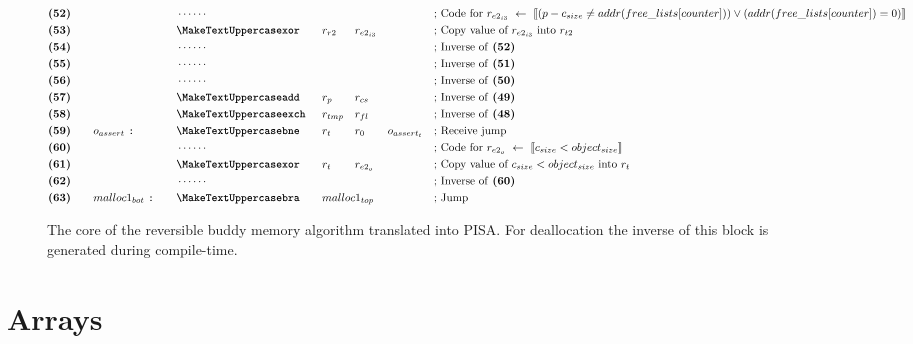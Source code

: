 \begin{figure}[ht]
{\begin{minipage}{\linewidth}
\begin{alignat*}{7}
    &\textbf{(52)}\quad&& &&\cdots\cdots && && && &&\text{; Code for $r_{e2_{i3}}\ \leftarrow\ \llbracket (p - c_{size} \neq addr(free\_lists[counter])) \vee (addr(free\_lists[counter]) = 0) \rrbracket$}\\
    &\textbf{(53)}\quad&& &&\inst{xor} &&r_{r2} && r_{e2_{i3}} && && \text{; Copy value of $r_{e2_{i3}}$ into $r_{t2}$}\\
    &\textbf{(54)}\quad&& &&\cdots\cdots && && && &&\text{; Inverse of \textbf{(52)}}\\
    &\textbf{(55)}\quad&& &&\cdots\cdots && && && &&\text{; Inverse of \textbf{(51)}}\\
    &\textbf{(56)}\quad&& &&\cdots\cdots && && && &&\text{; Inverse of \textbf{(50)}}\\
    &\textbf{(57)}\quad&& &&\inst{add} &&r_{p} && r_{cs} && && \text{; Inverse of \textbf{(49)}}\\
    &\textbf{(58)}\quad&& &&\inst{exch} &&r_{tmp} && r_{fl} && && \text{; Inverse of \textbf{(48)}}\\
    &\textbf{(59)}\quad&&o_{assert}\ \texttt{:}\quad &&\inst{bne} &&r_{t} && r_0 && o_{assert_t} && \text{; Receive jump}\\
    &\textbf{(60)}\quad&& &&\cdots\cdots && && && &&\text{; Code for $r_{e2_o}\ \leftarrow\ \llbracket c_{size} < object_{size} \rrbracket$}\\
    &\textbf{(61)}\quad&& &&\inst{xor}\quad &&r_t && r_{e2_o} && &&\text{; Copy value of $c_{size} < object_{size}$ into $r_t$}\\        
    &\textbf{(62)}\quad&& &&\cdots\cdots && && && &&\text{; Inverse of \textbf{(60)}}\\ 
    &\textbf{(63)}\quad&&malloc1_{bot}\ \texttt{:}\quad  &&\inst{bra}\quad &&malloc1_{top} \span\omit\span\quad \span\omit\span\quad &&\text{; Jump}\\
    \end{alignat*}
    \end{minipage}
    }
    
    \caption{The core of the reversible buddy memory algorithm translated into PISA. For deallocation the inverse of this block is generated during compile-time.}
    \label{fig:malloc1-pisa} 
\end{figure}

\newpage

\section{Arrays}
\label{sec:arrays}

